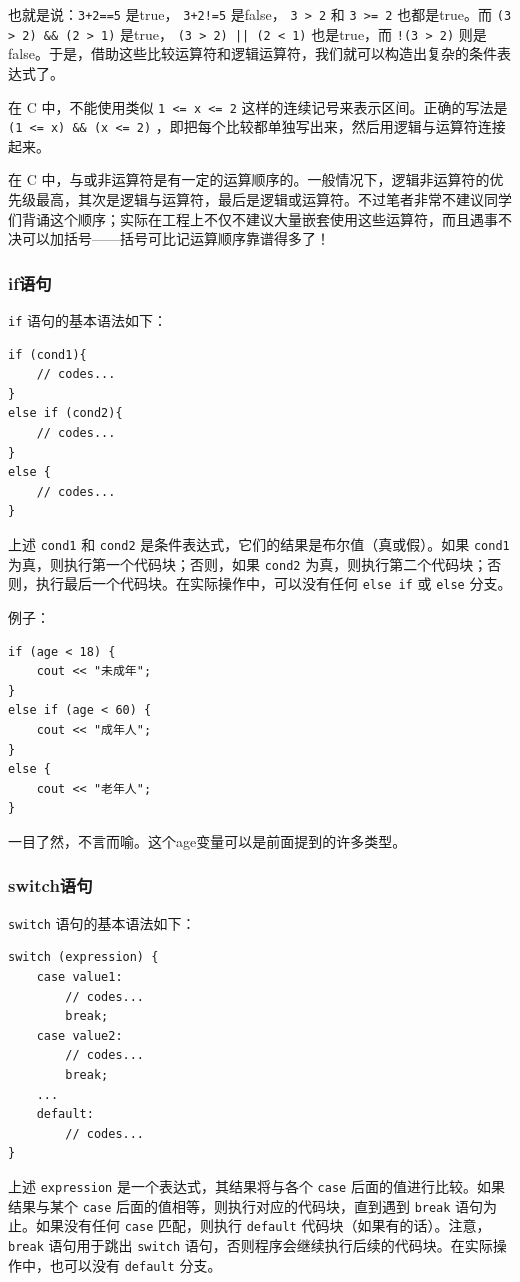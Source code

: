 也就是说：\texttt{3+2==5} 是true， \texttt{3+2!=5} 是false， \texttt{3 > 2} 和 \texttt{3 >= 2} 也都是true。而 \texttt{(3 > 2) \&\& (2 > 1)} 是true， \texttt{(3 > 2) || (2 < 1)} 也是true，而 \texttt{!(3 > 2)} 则是false。于是，借助这些比较运算符和逻辑运算符，我们就可以构造出复杂的条件表达式了。

\begin{tip}
  在 C 中，不能使用类似 \texttt{1 <= x <= 2} 这样的连续记号来表示区间。正确的写法是 \texttt{(1 <= x) \&\& (x <= 2)} ，即把每个比较都单独写出来，然后用逻辑与运算符连接起来。
\end{tip}

在 C 中，与或非运算符是有一定的运算顺序的。一般情况下，逻辑非运算符的优先级最高，其次是逻辑与运算符，最后是逻辑或运算符。不过笔者非常不建议同学们背诵这个顺序；实际在工程上不仅不建议大量嵌套使用这些运算符，而且遇事不决可以加括号——括号可比记运算顺序靠谱得多了！

\subsubsection{if语句}

\texttt{if} 语句的基本语法如下：
\begin{verbatim}
if (cond1){
    // codes...
}
else if (cond2){
    // codes...
}
else {
    // codes...
}
\end{verbatim}
上述 \texttt{cond1} 和 \texttt{cond2} 是条件表达式，它们的结果是布尔值（真或假）。如果 \texttt{cond1} 为真，则执行第一个代码块；否则，如果 \texttt{cond2} 为真，则执行第二个代码块；否则，执行最后一个代码块。在实际操作中，可以没有任何 \texttt{else if} 或 \texttt{else} 分支。

例子：
\begin{verbatim}
if (age < 18) {
    cout << "未成年";
}
else if (age < 60) {
    cout << "成年人";
}
else {
    cout << "老年人";
}
\end{verbatim}
一目了然，不言而喻。这个age变量可以是前面提到的许多类型。

\subsubsection{switch语句}

\texttt{switch} 语句的基本语法如下：

\begin{verbatim}
switch (expression) {
    case value1:
        // codes...
        break;
    case value2:
        // codes...
        break;
    ...
    default:
        // codes...
}
\end{verbatim}
上述 \texttt{expression} 是一个表达式，其结果将与各个 \texttt{case} 后面的值进行比较。如果结果与某个 \texttt{case} 后面的值相等，则执行对应的代码块，直到遇到 \texttt{break} 语句为止。如果没有任何 \texttt{case} 匹配，则执行 \texttt{default} 代码块（如果有的话）。注意， \texttt{break} 语句用于跳出 \texttt{switch} 语句，否则程序会继续执行后续的代码块。在实际操作中，也可以没有 \texttt{default} 分支。

